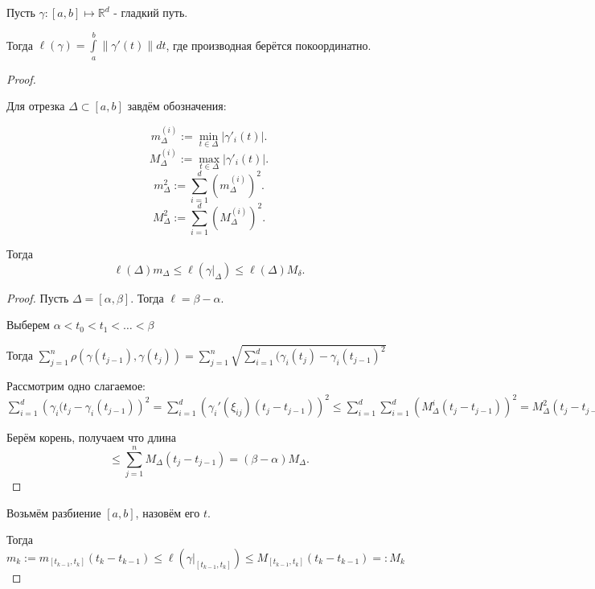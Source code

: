 \begin{theorem} \thmslashn

    Пусть $\gamma : [a, b] \mapsto \mathbb{R}^{d}$ - гладкий путь.

    Тогда $\ell(\gamma) = \int\limits_{a}^{b} \|\gamma'(t)\|dt$, где производная берётся покоординатно.
    \begin{proof} \thmslashn
    
        \begin{lemma} \thmslashn
        
            Для отрезка $\Delta \subset [a, b]$ завдём обозначения:

            \[ m_{\Delta}^{(i)} := \min\limits_{t\in \Delta} |\gamma'_{i}(t)| .\] 
            \[ M_{\Delta}^{(i)} := \max\limits_{t\in \Delta} |\gamma'_{i}(t)| .\]
            \[ m_{\Delta}^2 := \sum\limits_{i=1}^{d} (m_{\Delta}^{(i)})^2 .\] 
            \[ M_{\Delta}^2 := \sum\limits_{i=1}^{d} (M_{\Delta}^{(i)})^2 .\] 

            Тогда
            \[ \ell(\Delta)m_{\Delta} \le \ell\left(\left.\gamma\right|_{\Delta}\right) \le \ell(\Delta) M_{\delta}.\]
                \begin{proof} \thmslashn
                
                    Пусть $\Delta = [\alpha, \beta]$. Тогда $\ell = \beta - \alpha$.

                    Выберем $\alpha < t_0 < t_1 < \ldots < \beta$

                    Тогда $\sum\limits_{j=1}^{n} \rho(\gamma(t_{j-1}), \gamma(t_{j})) = \sum\limits_{j=1}^{n}\sqrt{\sum\limits_{i=1}^{d}(\gamma_{i}(t_{j}) - \gamma_{i}(t_{j-1})^2}$

                    Рассмотрим одно слагаемое: $\sum\limits_{i=1}^{d}\left( \gamma_{i}(t_{j}-\gamma_{i}(t_{j-1}) \right)^2 = \sum\limits_{i=1}^{d} \left( \gamma_{i}'(\xi_{ij})(t_{j}-t_{j-1}) \right)^2  \le \sum\limits_{i=1}^{d} \sum\limits_{i=1}^{d} (M_{\Delta}^{i}(t_{j}-t_{j-1}))^2 = M_{\Delta}^2(t_{j}-t_{j-1})$

                    Берём корень, получаем что длина
                    \[ \le \sum\limits_{j=1}^{n} M_{\Delta}(t_{j}-t_{j-1}) = (\beta-\alpha)M_{\Delta} .\] 
                \end{proof}
        \end{lemma}
        \TODO 
        Возьмём разбиение $[a, b]$, назовём его $t$.

        Тогда $m_{k} := m_{[t_{k-1}, t_{k}]}(t_{k}-t_{k-1}) \le \ell\left( \left. \gamma\right|_{[t_{k-1}, t_{k}]} \right) \le M_{[t_{k-1}, t_{k}]}(t_{k}-t_{k-1}) =: M_{k}$


\end{proof}
\end{theorem}
